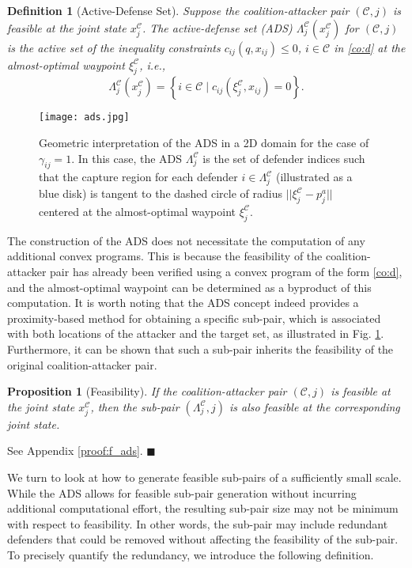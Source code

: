 \documentclass[journal]{IEEEtran}
\newtheorem{Definition}{\bf Definition}
\newenvironment{Proof}{\noindent{\em Proof:\/}}{\hfill $\blacksquare$\par}
\newtheorem{Proposition}{\bf Proposition}
\newcommand{\C}{\mathcal{C}}
\newcommand{\1}{\mathbf{1}}
\begin{document}
\begin{Definition}[Active-Defense Set]\label{def:ads}
Suppose the coalition-attacker pair $(\C,j)$ is feasible at the joint state $x^\C_j$. The \textit{active-defense set} (ADS) $\Lambda^\C_j(x^\C_j)$ for $(\C,j)$ is the active set of the inequality constraints $c_{ij}(q,x_{ij})\leq 0$, $i\in\C$ in \eqref{co:d} at the almost-optimal waypoint $\xi^\C_j$, i.e., 
\begin{equation}\label{ads}
	\Lambda^\C_j(x^\C_j)=\left\lbrace i\in \C\mid c_{ij}(\xi^\C_j,x_{ij})=0\right\rbrace.
\end{equation}
\end{Definition}

\begin{figure}[tp!] 
	\centering
	\texttt{[image: ads.jpg]}
	\caption{\footnotesize {Geometric interpretation of the ADS in a 2D domain for the case of $\gamma_{ij}=1$. In this case, the ADS $\Lambda^\C_j$ is the set of defender indices such that the capture region for each defender $i\in \Lambda^\C_j$ (illustrated as a blue disk) is tangent to the dashed circle of radius $||\xi^\C_j-p^a_j||$ centered at the almost-optimal waypoint $\xi^\C_j$.}
	\label{fig:ads}}
\end{figure}

The construction of the ADS does not necessitate the computation of any additional convex programs. This is because the feasibility of the coalition-attacker pair has already been verified using a convex program of the form \eqref{co:d}, and the almost-optimal waypoint can be determined as a byproduct of this computation. It is worth noting that the ADS concept indeed provides a proximity-based method for obtaining a specific sub-pair, which is associated with both locations of the attacker and the target set, as illustrated in Fig. \ref{fig:ads}. Furthermore, it can be shown that such a sub-pair inherits the feasibility of the original coalition-attacker pair.

\begin{Proposition}[Feasibility]\label{prop:f_ads}
If the coalition-attacker pair $(\C,j)$ is feasible at the joint state $x^{\C}_j$, then the sub-pair $(\Lambda^{\C}_j,j)$ is also feasible at the corresponding joint state.
\end{Proposition}

\begin{Proof}
See Appendix \ref{proof:f_ads}.
\end{Proof}

We turn to look at how to generate feasible sub-pairs of a sufficiently small scale. While the ADS allows for feasible sub-pair generation without incurring additional computational effort, the resulting sub-pair size may not be minimum with respect to feasibility. In other words, the sub-pair may include redundant defenders that could be removed without affecting the feasibility of the sub-pair. To precisely quantify the redundancy, we introduce the following definition.
\end{document}
